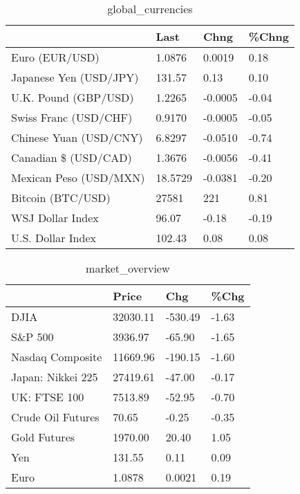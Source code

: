\documentclass{article}%
\begin{document}
%


\begin{table}[htbp]%
\caption{global\_currencies}%
\centering%
\begin{adjustbox}{width=1\textwidth}%
\begin{tabular}{llll}
\toprule
                       &    Last &    Chng & \%Chng \\
\midrule
        Euro (EUR/USD) &  1.0876 &  0.0019 &  0.18 \\
Japanese Yen (USD/JPY) &  131.57 &    0.13 &  0.10 \\
  U.K. Pound (GBP/USD) &  1.2265 & -0.0005 & -0.04 \\
 Swiss Franc (USD/CHF) &  0.9170 & -0.0005 & -0.05 \\
Chinese Yuan (USD/CNY) &  6.8297 & -0.0510 & -0.74 \\
  Canadian \$ (USD/CAD) &  1.3676 & -0.0056 & -0.41 \\
Mexican Peso (USD/MXN) & 18.5729 & -0.0381 & -0.20 \\
     Bitcoin (BTC/USD) &   27581 &     221 &  0.81 \\
      WSJ Dollar Index &   96.07 &   -0.18 & -0.19 \\
     U.S. Dollar Index &  102.43 &    0.08 &  0.08 \\
\bottomrule
\end{tabular}
%
\end{adjustbox}%
\end{table}

%


\begin{table}[htbp]%
\caption{market\_overview}%
\centering%
\begin{adjustbox}{width=1\textwidth}%
\begin{tabular}{llll}
\toprule
                  &    Price &     Chg &  \%Chg \\
\midrule
             DJIA & 32030.11 & -530.49 & -1.63 \\
          S\&P 500 &  3936.97 &  -65.90 & -1.65 \\
 Nasdaq Composite & 11669.96 & -190.15 & -1.60 \\
Japan: Nikkei 225 & 27419.61 &  -47.00 & -0.17 \\
     UK: FTSE 100 &  7513.89 &  -52.95 & -0.70 \\
Crude Oil Futures &    70.65 &   -0.25 & -0.35 \\
     Gold Futures &  1970.00 &   20.40 &  1.05 \\
              Yen &   131.55 &    0.11 &  0.09 \\
             Euro &   1.0878 &  0.0021 &  0.19 \\
\bottomrule
\end{tabular}
%
\end{adjustbox}%
\end{table}

%
\end{document}
